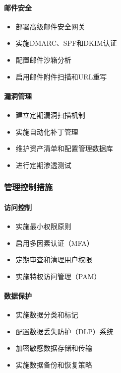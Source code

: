 \documentclass[12pt,a4paper]{article}
\begin{document}
\paragraph{邮件安全}
\begin{itemize}
    \item 部署高级邮件安全网关
    \item 实施DMARC、SPF和DKIM认证
    \item 配置邮件沙箱分析
    \item 启用邮件附件扫描和URL重写
\end{itemize}

\paragraph{漏洞管理}
\begin{itemize}
    \item 建立定期漏洞扫描机制
    \item 实施自动化补丁管理
    \item 维护资产清单和配置管理数据库
    \item 进行定期渗透测试
\end{itemize}

\subsubsection{管理控制措施}

\paragraph{访问控制}
\begin{itemize}
    \item 实施最小权限原则
    \item 启用多因素认证（MFA）
    \item 定期审查和清理用户权限
    \item 实施特权访问管理（PAM）
\end{itemize}

\paragraph{数据保护}
\begin{itemize}
    \item 实施数据分类和标记
    \item 配置数据丢失防护（DLP）系统
    \item 加密敏感数据存储和传输
    \item 实施数据备份和恢复策略
\end{itemize}
\end{document}
